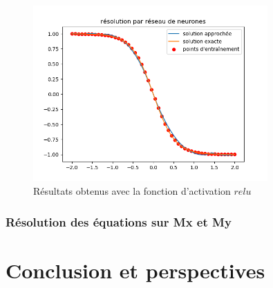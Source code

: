 \documentclass[12pt]{report}
\begin{document}
\begin{figure}
    \centering
    \includegraphics[width=0.8\textwidth]{direct_relu_0.001_10000_32_16_v2.png}
    \caption{Résultats obtenus avec la fonction d'activation $relu$}
    \label{fig:relu apprentissage direct}
\end{figure}

\subsection{Résolution des équations sur Mx et My}

\chapter{Conclusion et perspectives}
\label{Conclusion}

\begin{thebibliography}{2}
\end{thebibliography}
\end{document}
